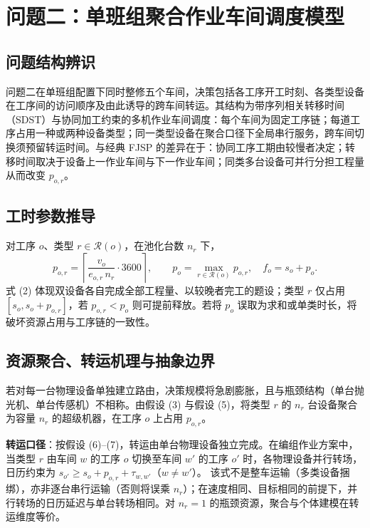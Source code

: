 \documentclass[12pt,a4paper]{ctexart}
\begin{document}
\section{问题二：单班组聚合作业车间调度模型}

\subsection{问题结构辨识}
问题二在单班组配置下同时整修五个车间，决策包括各工序开工时刻、各类型设备在工序间的访问顺序及由此诱导的跨车间转运。其结构为带序列相关转移时间（SDST）与协同加工约束的多机作业车间调度：每个车间为固定工序链；每道工序占用一种或两种设备类型；同一类型设备在聚合口径下全局串行服务，跨车间切换须预留转运时间。与经典 FJSP 的差异在于：协同工序工期由较慢者决定；转移时间取决于设备上一作业车间与下一作业车间；同类多台设备可并行分担工程量从而改变 $p_{o,r}$。

\subsection{工时参数推导}
对工序 $o$、类型 $r\in\mathcal{R}(o)$，在池化台数 $n_r$ 下，
\begin{equation}
p_{o,r}=\left\lceil\frac{v_o}{e_{o,r}\,n_r}\cdot 3600\right\rceil,\qquad
p_o=\max_{r\in\mathcal{R}(o)}p_{o,r},\quad f_o=s_o+p_o.
\end{equation}
式 (2) 体现双设备各自完成全部工程量、以较晚者完工的题设；类型 $r$ 仅占用 $[s_o,s_o+p_{o,r}]$，若 $p_{o,r}<p_o$ 则可提前释放。若将 $p_o$ 误取为求和或单类时长，将破坏资源占用与工序链的一致性。

\subsection{资源聚合、转运机理与抽象边界}
若对每一台物理设备单独建立路由，决策规模将急剧膨胀，且与瓶颈结构（单台抛光机、单台传感机）不相称。由假设 (3) 与假设 (5)，将类型 $r$ 的 $n_r$ 台设备聚合为容量 $n_r$ 的超级机器，在工序 $o$ 上占用 $p_{o,r}$。

\textbf{转运口径}：按假设 (6)--(7)，转运由单台物理设备独立完成。在编组作业方案中，当类型 $r$ 由车间 $w$ 的工序 $o$ 切换至车间 $w'$ 的工序 $o'$ 时，各物理设备并行转场，日历约束为
$s_{o'}\ge s_o+p_{o,r}+\tau_{w,w'}$（$w\neq w'$）。
该式不是整车运输（多类设备捆绑），亦非逐台串行运输（否则将误乘 $n_r$）；在速度相同、目标相同的前提下，并行转场的日历延迟与单台转场相同。对 $n_r=1$ 的瓶颈资源，聚合与个体建模在转运维度等价。
\end{document}
